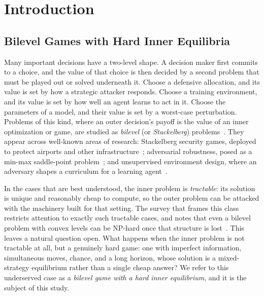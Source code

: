 
\section{Introduction}
\label{sec:introduction}

\subsection{Bilevel Games with Hard Inner Equilibria}

Many important decisions have a two-level shape. A decision maker first commits
to a choice, and the value of that choice is then decided by a second problem
that must be played out or solved underneath it. Choose a defensive allocation,
and its value is set by how a strategic attacker responds. Choose a training
environment, and its value is set by how well an agent learns to act in it.
Choose the parameters of a model, and their value is set by a worst-case
perturbation. Problems of this kind, where an outer decision's payoff is the
value of an inner optimization or game, are studied as \emph{bilevel} (or
\emph{Stackelberg}) problems~\cite{zhang2023bilevel}. They appear across
well-known areas of research: Stackelberg security games, deployed to protect
airports and other infrastructure~\cite{tambe2011security}; adversarial
robustness, posed as a min-max saddle-point problem~\cite{madry2018towards}; and
unsupervised environment design, where an adversary shapes a curriculum for a
learning agent~\cite{dennis2020emergent}.

In the cases that are best understood, the inner problem is
\emph{tractable}: its solution is unique and reasonably cheap to compute, so the
outer problem can be attacked with the machinery built for that setting. The
survey that frames this class restricts attention to exactly such tractable
cases, and notes that even a bilevel problem with convex levels can be NP-hard
once that structure is lost~\cite{zhang2023bilevel}. This leaves a natural
question open. What happens when the inner problem is not tractable at all, but a
genuinely hard game: one with imperfect information, simultaneous moves, chance,
and a long horizon, whose solution is a mixed-strategy equilibrium rather than a
single cheap answer? We refer to this underserved case as a \emph{bilevel game
with a hard inner equilibrium}, and it is the subject of this study.

